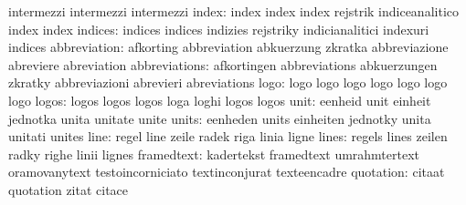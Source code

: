                            intermezzi                intermezzi
                           intermezzi
                    index: index                     index
                           index                     rejstrik
                           indiceanalitico           index
                           index
                  indices: indices                   indices
                           indizies                  rejstriky
                           indicianalitici           indexuri
                           indices
             abbreviation: afkorting                 abbreviation
                           abkuerzung                zkratka
                           abbreviazione             abreviere
                           abreviation
            abbreviations: afkortingen               abbreviations
                           abkuerzungen              zkratky
                           abbreviazioni             abrevieri
                           abreviations
                     logo: logo                      logo
                           logo                      logo
                           logo                      logo
                           logo
                    logos: logos                     logos
                           logos                     loga
                           loghi                     logos
                           logos
                     unit: eenheid                   unit
                           einheit                   jednotka
                           unita                     unitate
                           unite
                    units: eenheden                  units
                           einheiten                 jednotky
                           unita                     unitati
                           unites
                     line: regel                     line
                           zeile                     radek
                           riga                      linia
                           ligne
                    lines: regels                    lines
                           zeilen                    radky
                           righe                     linii
                           lignes
               framedtext: kadertekst                framedtext
                           umrahmtertext             oramovanytext
                           testoincorniciato         textinconjurat
                           texteencadre
                quotation: citaat                    quotation
                           zitat                     citace
